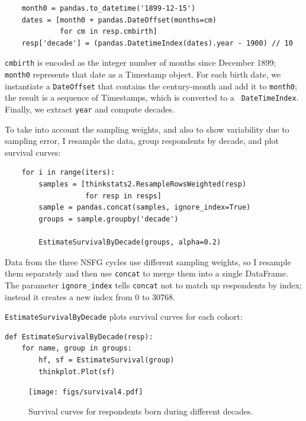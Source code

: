 \documentclass[12pt]{book}
\theoremstyle{exercise}
\begin{document}
\begin{verbatim}
    month0 = pandas.to_datetime('1899-12-15')
    dates = [month0 + pandas.DateOffset(months=cm) 
             for cm in resp.cmbirth]
    resp['decade'] = (pandas.DatetimeIndex(dates).year - 1900) // 10
\end{verbatim}

{\tt cmbirth} is encoded as the integer number of months since
December 1899; {\tt month0} represents that date as a Timestamp
object.  For each birth date, we instantiate a {\tt DateOffset} that
contains the century-month and add it to {\tt month0}; the result
is a sequence of Timestamps, which is converted to a {\tt
  DateTimeIndex}.  Finally, we extract {\tt year} and compute
decades.%
%
%

To take into account the sampling weights, and also to show
variability due to sampling error, I resample the data,
group respondents by decade, and plot survival curves:%
%

\begin{verbatim}
    for i in range(iters):
        samples = [thinkstats2.ResampleRowsWeighted(resp) 
                   for resp in resps]
        sample = pandas.concat(samples, ignore_index=True)
        groups = sample.groupby('decade')

        EstimateSurvivalByDecade(groups, alpha=0.2)
\end{verbatim}

Data from the three NSFG cycles use different sampling weights,
so I resample them separately and then use {\tt concat}
to merge them into a single DataFrame.  The parameter \verb"ignore_index"
tells {\tt concat} not to match up respondents by index; instead
it creates a new index from 0 to 30768.%
%
%

{\tt EstimateSurvivalByDecade} plots survival curves for each cohort:

\begin{verbatim}
def EstimateSurvivalByDecade(resp):
    for name, group in groups:
        hf, sf = EstimateSurvival(group)
        thinkplot.Plot(sf)
\end{verbatim}

\begin{figure}
\centerline{\texttt{[image: figs/survival4.pdf]}}
\caption{Survival curves for respondents born during different decades.}%
\label{survival4}
\end{figure}
\end{document}
